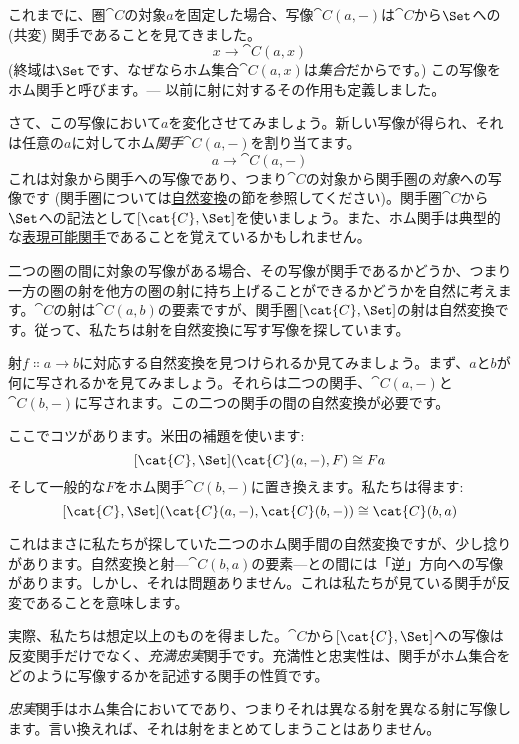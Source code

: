 
\lettrine[lhang=0.17]{こ}{れまで}に、圏$\cat{C}$の対象$a$を固定した場合、写像$\cat{C}(a, -)$は$\cat{C}$から$\Set$への (共変) 関手であることを見てきました。
\[x \to \cat{C}(a, x)\]
 (終域は$\Set$です、なぜならホム集合$\cat{C}(a, x)$は\emph{集合}だからです。) この写像をホム関手と呼びます。--- 以前に射に対するその作用も定義しました。

さて、この写像において$a$を変化させてみましょう。新しい写像が得られ、それは任意の$a$に対してホム\emph{関手}$\cat{C}(a, -)$を割り当てます。
\[a \to \cat{C}(a, -)\]
これは対象から関手への写像であり、つまり$\cat{C}$の対象から関手圏の\emph{対象}への写像です (関手圏については\hyperref[natural-transformations]{自然変換}の節を参照してください)。関手圏$\cat{C}$から$\Set$への記法として$[\cat{C}, \Set]$を使いましょう。また、ホム関手は典型的な\hyperref[representable-functors]{表現可能関手}であることを覚えているかもしれません。

二つの圏の間に対象の写像がある場合、その写像が関手であるかどうか、つまり一方の圏の射を他方の圏の射に持ち上げることができるかどうかを自然に考えます。$\cat{C}$の射は$\cat{C}(a, b)$の要素ですが、関手圏$[\cat{C}, \Set]$の射は自然変換です。従って、私たちは射を自然変換に写す写像を探しています。

射$f \Colon a \to b$に対応する自然変換を見つけられるか見てみましょう。まず、$a$と$b$が何に写されるかを見てみましょう。それらは二つの関手、$\cat{C}(a, -)$と$\cat{C}(b, -)$に写されます。この二つの関手の間の自然変換が必要です。

ここでコツがあります。米田の補題を使います: 
\[[\cat{C}, \Set](\cat{C}(a, -), F) \cong F a\]
そして一般的な$F$をホム関手$\cat{C}(b, -)$に置き換えます。私たちは得ます: 
\[[\cat{C}, \Set](\cat{C}(a, -), \cat{C}(b, -)) \cong \cat{C}(b, a)\]

\noindent
これはまさに私たちが探していた二つのホム関手間の自然変換ですが、少し捻りがあります。自然変換と射---$\cat{C}(b, a)$の要素---との間には「逆」方向への写像があります。しかし、それは問題ありません。これは私たちが見ている関手が反変であることを意味します。

\noindent
実際、私たちは想定以上のものを得ました。$\cat{C}$から$[\cat{C}, \Set]$への写像は反変関手だけでなく、\emph{充満忠実}関手です。充満性と忠実性は、関手がホム集合をどのように写像するかを記述する関手の性質です。

\emph{忠実}関手はホム集合においてであり、つまりそれは異なる射を異なる射に写像します。言い換えれば、それは射をまとめてしまうことはありません。

